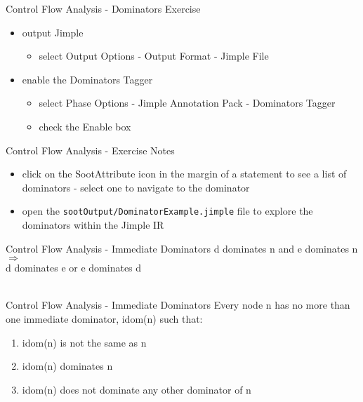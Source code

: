 \documentclass[mcgill,slideColor,colorBG,pdf]{prosper}
\begin{document}
\begin{slide} {Control Flow Analysis - Dominators Exercise}
\begin{itemize}
\item output Jimple
\begin{itemize}
\item select Output Options - Output Format - Jimple File
\end{itemize}
\item enable the Dominators Tagger
\begin{itemize}
\item select Phase Options - Jimple Annotation Pack - Dominators Tagger
\item check the Enable box
\end{itemize}
\end{itemize}
\end{slide}

\begin{slide} {Control Flow Analysis - Exercise Notes}
\begin{itemize}
\item click on the SootAttribute icon
in the margin of a statement to see a list of dominators - select one to navigate to the dominator
\item open the \texttt{sootOutput/DominatorExample.jimple} file to explore the dominators within the Jimple IR
\end{itemize}
\end{slide}

\begin{slide} {Control Flow Analysis - Immediate Dominators}
d dominates n and e dominates n $\Rightarrow$ \\d dominates e or e dominates d\\
\ \\
\begin{center}
\end{center}
\end{slide}

\begin{slide} {Control Flow Analysis - Immediate Dominators}
Every node n has no more than one immediate dominator, idom(n) such that:
\begin{enumerate}
\item idom(n) is not the same as n
\item idom(n) dominates n
\item idom(n) does not dominate any other dominator of n
\end{enumerate}
\begin{center}
\end{center}
\end{slide}
\end{document}
